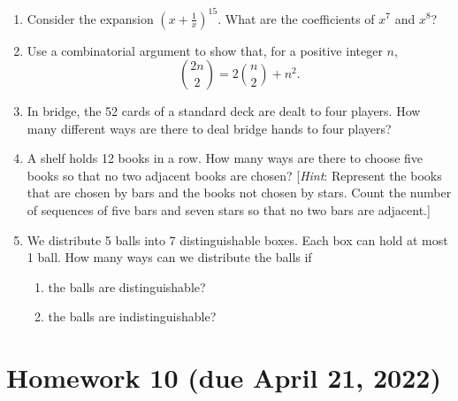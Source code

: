 \documentclass[letterpaper, 12pt]{article}
\begin{document}
\begin{enumerate}
    \item Consider the expansion $\left(x + \frac{1}{x}\right)^{15}$. What are the coefficients of $x^7$ and $x^8$?
    \item Use a combinatorial argument to show that, for a positive integer $n$,
    \[\binom{2n}{2} = 2 \binom{n}{2} + n^2.\]
    \item In bridge, the 52 cards of a standard deck are dealt to four players. How many different ways are there to deal bridge hands to four players?
    \item  A shelf holds 12 books in a row. How many ways are there to choose five books so that no two adjacent books are chosen? [\textit{Hint}: Represent the books that are chosen by bars and the books not chosen by stars. Count the number of sequences of five bars and seven stars so that no two bars are adjacent.]
    \item We distribute 5 balls into 7 distinguishable boxes. Each box can hold at most 1 ball. How many ways can we distribute the balls if
    \begin{enumerate}
        \item the balls are distinguishable?
        \item the balls are indistinguishable?
    \end{enumerate}
\end{enumerate}

\section*{Homework 10 (due April 21, 2022)}
\end{document}
